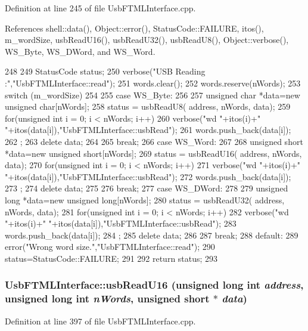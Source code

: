 Definition at line 245 of file UsbFTMLInterface.cpp.

References shell::data(), Object::error(), StatusCode::FAILURE, itos(), m\_\-wordSize, usbReadU16(), usbReadU32(), usbReadU8(), Object::verbose(), WS\_\-Byte, WS\_\-DWord, and WS\_\-Word.


\begin{DoxyCode}
248 {
249   StatusCode status;
250   verbose("USB Reading :","UsbFTMLInterface::read");
251   words.clear();
252   words.reserve(nWords);
253   switch (m_wordSize)
254   {
255   case WS_Byte:
256     {
257       unsigned char *data=new unsigned char[nWords];
258       status = usbReadU8( address, nWords, data);
259       for(unsigned int i = 0; i < nWords; i++){
260         verbose("wd "+itos(i)+" "+itos(data[i]),"UsbFTMLInterface::usbRead");
261         words.push_back(data[i]);
262       };
263       delete data;
264     }
265     break;
266   case WS_Word:
267     {
268       unsigned short *data=new unsigned short[nWords];
269       status = usbReadU16( address, nWords, data);
270       for(unsigned int i = 0; i < nWords; i++){
271         verbose("wd "+itos(i)+" "+itos(data[i]),"UsbFTMLInterface::usbRead");
272         words.push_back(data[i]);
273       };
274       delete data;
275     }
276     break;
277   case WS_DWord:
278     {
279       unsigned long *data=new unsigned long[nWords];
280       status = usbReadU32( address, nWords, data);
281       for(unsigned int i = 0; i < nWords; i++){
282         verbose("wd "+itos(i)+" "+itos(data[i]),"UsbFTMLInterface::usbRead");
283         words.push_back(data[i]);
284       };
285       delete data;
286     }
287     break;
288   default:
289     error("Wrong word size.","UsbFTMLInterface::read");
290     status=StatusCode::FAILURE;
291   }
292   return status;
293 }
\end{DoxyCode}
\hypertarget{classUsbFTMLInterface_a5fb608bce418671265b61266033cedc0}{
\subsubsection[{usbReadU16}]{ UsbFTMLInterface::usbReadU16 (unsigned long int {\em address}, \/  unsigned long int {\em nWords}, \/  unsigned short $\ast$ {\em data})}}
\label{classUsbFTMLInterface_a5fb608bce418671265b61266033cedc0}


Definition at line 397 of file UsbFTMLInterface.cpp.

